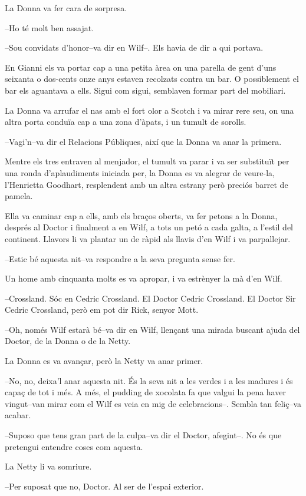 La Donna va fer cara de sorpresa.

--Ho té molt ben assajat.

--Sou convidats d'honor--va dir en Wilf--. Els havia de dir a qui
portava.

En Gianni els va portar cap a una petita àrea on una parella de gent
d'uns seixanta o dos-cents onze anys estaven recolzats contra un bar. O
possiblement el bar els aguantava a ells. Sigui com sigui, semblaven
formar part del mobiliari.

La Donna va arrufar el nas amb el fort olor a Scotch i va mirar rere
seu, on una altra porta conduïa cap a una zona d'àpats, i un tumult de
sorolls.

--Vagi'n--va dir el Relacions Públiques, així que la Donna va anar la
primera.

Mentre els tres entraven al menjador, el tumult va parar i va ser
substituït per una ronda d'aplaudiments iniciada per, la Donna es va
alegrar de veure-la, l'Henrietta Goodhart, resplendent amb un altra
estrany però preciós barret de pamela.

Ella va caminar cap a ells, amb els braços oberts, va fer petons a la
Donna, després al Doctor i finalment a en Wilf, a tots un petó a cada
galta, a l'estil del continent. Llavors li va plantar un de ràpid als
llavis d'en Wilf i va parpallejar.

--Estic bé aquesta nit--va respondre a la seva pregunta sense fer.

Un home amb cinquanta molts es va apropar, i va estrènyer la mà d'en
Wilf.

--Crossland. Sóc en Cedric Crossland. El Doctor Cedric Crossland. El
Doctor Sir Cedric Crossland, però em pot dir Rick, senyor Mott.

--Oh, només Wilf estarà bé--va dir en Wilf, llençant una mirada buscant
ajuda del Doctor, de la Donna o de la Netty.

La Donna es va avançar, però la Netty va anar primer.

--No, no, deixa'l anar aquesta nit. És la seva nit a les verdes i a les
madures i és capaç de tot i més. A més, el pudding de xocolata fa que
valgui la pena haver vingut--van mirar com el Wilf es veia en mig de
celebracions--. Sembla tan feliç--va acabar.

--Suposo que tens gran part de la culpa--va dir el Doctor, afegint--. No
és que pretengui entendre coses com aquesta.

La Netty li va somriure.

--Per suposat que no, Doctor. Al ser de l'espai exterior.

